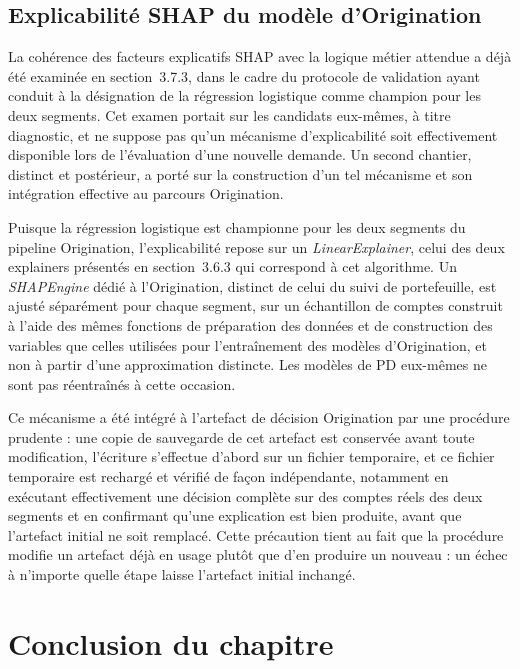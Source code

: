 \subsection{Explicabilité SHAP du modèle d'Origination}

La cohérence des facteurs explicatifs SHAP avec la logique métier attendue a déjà été examinée en section~3.7.3, dans le cadre du protocole de validation ayant conduit à la désignation de la régression logistique comme champion pour les deux segments. Cet examen portait sur les candidats eux-mêmes, à titre diagnostic, et ne suppose pas qu'un mécanisme d'explicabilité soit effectivement disponible lors de l'évaluation d'une nouvelle demande. Un second chantier, distinct et postérieur, a porté sur la construction d'un tel mécanisme et son intégration effective au parcours Origination.

Puisque la régression logistique est championne pour les deux segments du pipeline Origination, l'explicabilité repose sur un \emph{LinearExplainer}, celui des deux explainers présentés en section~3.6.3 qui correspond à cet algorithme. Un \emph{SHAPEngine} dédié à l'Origination, distinct de celui du suivi de portefeuille, est ajusté séparément pour chaque segment, sur un échantillon de comptes construit à l'aide des mêmes fonctions de préparation des données et de construction des variables que celles utilisées pour l'entraînement des modèles d'Origination, et non à partir d'une approximation distincte. Les modèles de PD eux-mêmes ne sont pas réentraînés à cette occasion.

Ce mécanisme a été intégré à l'artefact de décision Origination par une procédure prudente : une copie de sauvegarde de cet artefact est conservée avant toute modification, l'écriture s'effectue d'abord sur un fichier temporaire, et ce fichier temporaire est rechargé et vérifié de façon indépendante, notamment en exécutant effectivement une décision complète sur des comptes réels des deux segments et en confirmant qu'une explication est bien produite, avant que l'artefact initial ne soit remplacé. Cette précaution tient au fait que la procédure modifie un artefact déjà en usage plutôt que d'en produire un nouveau : un échec à n'importe quelle étape laisse l'artefact initial inchangé.

\section*{Conclusion du chapitre}

